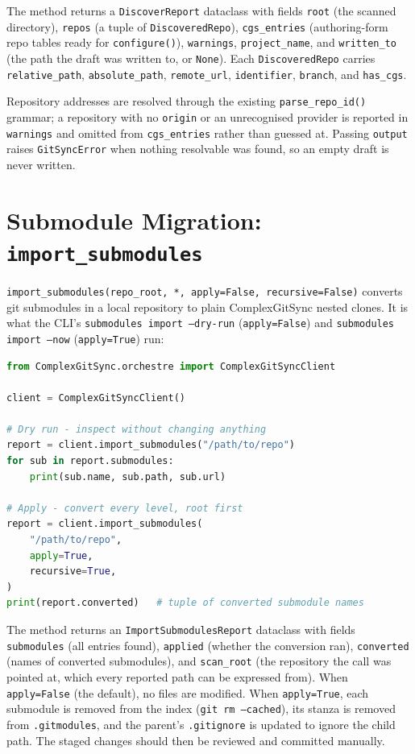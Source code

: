 The method returns a \texttt{DiscoverReport} dataclass with fields
\texttt{root} (the scanned directory), \texttt{repos} (a tuple of
\texttt{DiscoveredRepo}), \texttt{cgs\_entries} (authoring-form repo tables
ready for \texttt{configure()}), \texttt{warnings}, \texttt{project\_name},
and \texttt{written\_to} (the path the draft was written to, or
\texttt{None}).  Each \texttt{DiscoveredRepo} carries
\texttt{relative\_path}, \texttt{absolute\_path}, \texttt{remote\_url},
\texttt{identifier}, \texttt{branch}, and \texttt{has\_cgs}.

Repository addresses are resolved through the existing
\texttt{parse\_repo\_id()} grammar; a repository with no \texttt{origin} or
an unrecognised provider is reported in \texttt{warnings} and omitted from
\texttt{cgs\_entries} rather than guessed at.  Passing \texttt{output}
raises \texttt{GitSyncError} when nothing resolvable was found, so an empty
draft is never written.

\section{Submodule Migration: \texttt{import\_submodules}}

\texttt{import\_submodules(repo\_root, *, apply=False, recursive=False)}
converts git submodules in a local repository to plain ComplexGitSync
nested clones. It is what the CLI's \texttt{submodules import --dry-run}
(\texttt{apply=False}) and \texttt{submodules import --now} (\texttt{apply=True})
run:

\begin{lstlisting}[language=python]
from ComplexGitSync.orchestre import ComplexGitSyncClient

client = ComplexGitSyncClient()

# Dry run - inspect without changing anything
report = client.import_submodules("/path/to/repo")
for sub in report.submodules:
    print(sub.name, sub.path, sub.url)

# Apply - convert every level, root first
report = client.import_submodules(
    "/path/to/repo",
    apply=True,
    recursive=True,
)
print(report.converted)   # tuple of converted submodule names
\end{lstlisting}

The method returns an \texttt{ImportSubmodulesReport} dataclass with fields
\texttt{submodules} (all entries found), \texttt{applied} (whether the
conversion ran), \texttt{converted} (names of converted submodules), and
\texttt{scan\_root} (the repository the call was pointed at, which every
reported path can be expressed from).  When \texttt{apply=False} (the
default), no files are modified.  When \texttt{apply=True}, each submodule
is removed from the index (\texttt{git rm --cached}), its stanza is removed
from \texttt{.gitmodules}, and the parent's \texttt{.gitignore} is updated
to ignore the child path.  The staged changes should then be reviewed and
committed manually.

